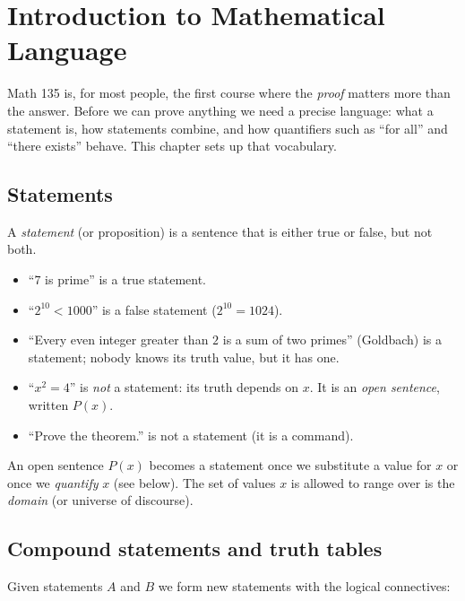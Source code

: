 \chapter{Introduction to Mathematical Language}

Math 135 is, for most people, the first course where the \emph{proof} matters more than the
answer. Before we can prove anything we need a precise language: what a statement is, how
statements combine, and how quantifiers such as ``for all'' and ``there exists'' behave.
This chapter sets up that vocabulary.

\section{Statements}

\begin{definition}[Statement]
A \emph{statement} (or proposition) is a sentence that is either true or false, but not both.
\end{definition}

\begin{example}
\begin{itemize}
  \item ``$7$ is prime'' is a true statement.
  \item ``$2^{10} < 1000$'' is a false statement ($2^{10} = 1024$).
  \item ``Every even integer greater than $2$ is a sum of two primes'' (Goldbach) is a
        statement; nobody knows its truth value, but it has one.
  \item ``$x^2 = 4$'' is \emph{not} a statement: its truth depends on $x$. It is an
        \emph{open sentence}, written $P(x)$.
  \item ``Prove the theorem.'' is not a statement (it is a command).
\end{itemize}
\end{example}

An open sentence $P(x)$ becomes a statement once we substitute a value for $x$ or once we
\emph{quantify} $x$ (see below). The set of values $x$ is allowed to range over is the
\emph{domain} (or universe of discourse).

\section{Compound statements and truth tables}

Given statements $A$ and $B$ we form new statements with the logical connectives:

